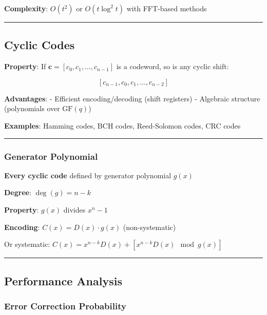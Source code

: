 \textbf{Complexity}: \(O(t^2)\) or \(O(t \log^2 t)\) with FFT-based
methods

\begin{center}\rule{0.5\linewidth}{0.5pt}\end{center}

\subsection{Cyclic Codes}\label{cyclic-codes}

\textbf{Property}: If \(\mathbf{c} = [c_0, c_1, \ldots, c_{n-1}]\) is a
codeword, so is any cyclic shift:

\[
[c_{n-1}, c_0, c_1, \ldots, c_{n-2}]
\]

\textbf{Advantages}: - Efficient encoding/decoding (shift registers) -
Algebraic structure (polynomials over \(\mathrm{GF}(q)\))

\textbf{Examples}: Hamming codes, BCH codes, Reed-Solomon codes, CRC
codes

\begin{center}\rule{0.5\linewidth}{0.5pt}\end{center}

\subsubsection{Generator Polynomial}\label{generator-polynomial}

\textbf{Every cyclic code} defined by generator polynomial \(g(x)\)

\textbf{Degree}: \(\deg(g) = n - k\)

\textbf{Property}: \(g(x)\) divides \(x^n - 1\)

\textbf{Encoding}: \(C(x) = D(x) \cdot g(x)\) (non-systematic)

Or systematic: \(C(x) = x^{n-k} D(x) + [x^{n-k} D(x) \mod g(x)]\)

\begin{center}\rule{0.5\linewidth}{0.5pt}\end{center}

\subsection{Performance Analysis}\label{performance-analysis}

\subsubsection{Error Correction
Probability}\label{error-correction-probability}

